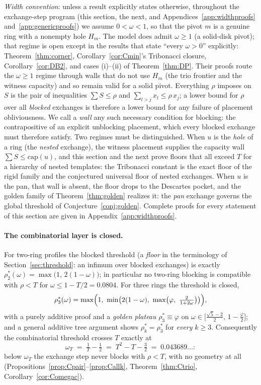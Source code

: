 \documentclass[11pt]{article}
\theoremstyle{definition}
\begin{document}
\emph{Width convention}: unless a result explicitly states otherwise,
throughout the exchange-step program (this section, the next, and
Appendices~\ref{app:widthproofs} and~\ref{app:genericproofs}) we assume
$0<\omega<1$, so that the pivot $m$ is a genuine ring with a nonempty
hole $H_m$. The model does admit $\omega\ge1$ (a solid-disk pivot); that
regime is open except in the results that state ``every $\omega>0$''
explicitly: Theorem~\ref{thm:corner}, Corollary~\ref{cor:Cmin}'s
Tribonacci closure, Corollary~\ref{cor:DB2}, and cases (i)--(ii) of
Theorem~\ref{thm:DP}. Their proofs route the $\omega\ge1$ regime
through walls that do not use $H_m$ (the trio frontier and the witness
capacity) and so remain valid for a solid pivot. Everything $\rho$
imposes on $S$ is the pair of inequalities $\sum S\le\rho$ and
$\sum_{l>j}x_l\le\rho\,x_j$; a lower bound for $\rho$ over all
\emph{blocked} exchanges is therefore a lower bound for any failure of
placement obliviousness. We call a \emph{wall} any such necessary
condition for blocking: the contrapositive of an explicit unblocking
placement, which every blocked exchange must therefore satisfy. Two
regimes must be distinguished. When $u$ is
the \emph{hole} of a ring (the \emph{nested} exchange), the witness
placement supplies the capacity wall $\sum S\le\mathrm{cap}(u)$, and this
section and the next prove floors that all exceed $T$ for a hierarchy of
nested templates: the Tribonacci constant is the exact floor of the
rigid family and the conjectured universal floor of nested exchanges.
When $u$ is the pan, that wall is absent, the floor drops to the Descartes pocket, and
the golden family of Theorem~\ref{thm:golden} realizes it: the
\emph{pan} exchange governs the global threshold of
Conjecture~\ref{conj:golden}. Complete proofs for every statement of this
section are given in Appendix~\ref{app:widthproofs}.

\paragraph{The combinatorial layer is closed.}
For two-ring profiles the blocked threshold (a \emph{floor} in the
terminology of Section~\ref{sec:threshold}: an infimum over blocked
exchanges) is exactly
$\rho^*_2(\omega)=\max\bigl(1,\,2(1-\omega)\bigr)$; in particular no
two-ring blocking is compatible with $\rho<T$ for
$\omega\le1-T/2=0.0804$. For three rings the threshold is closed,
\[
\rho^*_3(\omega)=\max\Bigl(1,\ \min\bigl(2(1-\omega),\
\max\bigl(\varphi,\ \tfrac{2}{1+2\omega}\bigr)\bigr)\Bigr),
\]
with a purely additive proof and a \emph{golden plateau}
$\rho^*_3\equiv\varphi$ on
$\omega\in\bigl[\tfrac{\sqrt5-2}{2},\,1-\tfrac{\varphi}{2}\bigr]$; and a
general additive tree argument shows $\rho^*_k=\rho^*_3$ for \emph{every}
$k\ge3$. Consequently the combinatorial threshold crosses $T$ exactly at
\[
\omega_T \;=\; \tfrac1T-\tfrac12 \;=\; T^2-T-\tfrac32 \;=\;0.043689\dots :
\]
below $\omega_T$ the exchange step never blocks with $\rho<T$, with no
geometry at all
(Propositions~\ref{prop:Cpair}--\ref{prop:Callk},
Theorem~\ref{thm:Ctrio}, Corollary~\ref{cor:Comegac}).
\end{document}
